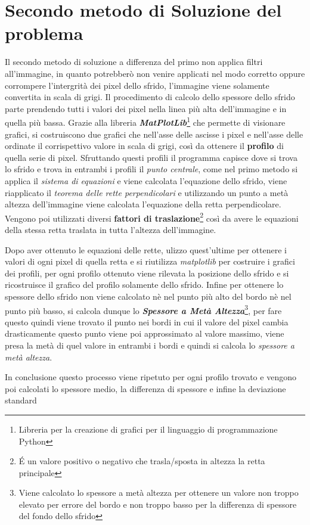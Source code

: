 \documentclass[a4paper, notitlepage, 12pt]{article}
\begin{document}
    \section{Secondo metodo di Soluzione del problema}
    \noindent Il secondo metodo di soluzione a differenza del primo non applica filtri all'immagine, in quanto potrebberò non venire applicati nel modo corretto oppure corrompere l'intergrità
    dei pixel dello sfrido, l'immagine viene solamente convertita in scala di grigi. Il procedimento di calcolo dello spessore dello sfrido parte prendendo tutti i valori dei pixel nella linea più alta 
    dell'immagine e in quella più bassa. Grazie alla libreria \emph{\textbf{MatPlotLib}}\footnote[9]{\indent Libreria per la creazione di grafici per il linguaggio di programmazione Python} che permette di visionare grafici, si costruiscono due grafici che nell'asse delle ascisse i pixel e nell'asse delle ordinate
    il corrispettivo valore in scala di grigi, così da ottenere il \textbf{profilo} di quella serie di pixel. Sfruttando questi profili il programma capisce dove si trova lo sfrido e trova in entrambi i profili
    il \emph{punto centrale}, come nel primo metodo si applica il \emph{sistema di equazioni} e viene calcolata l'equazione dello sfrido, viene riapplicato il \emph{teorema delle rette perpendicolari} e utilizzando un punto a metà altezza dell'immagine
    viene calcolata l'equazione della retta perpendicolare. Vengono poi utilizzati diversi \textbf{fattori di traslazione}\footnote[10]{\indent \'E un valore positivo o negativo che trasla/sposta in altezza la retta principale} così da avere le equazioni della stessa retta traslata in tutta l'altezza
    dell'immagine.\par
    \noindent Dopo aver ottenuto le equazioni delle rette, ulizzo quest'ultime per ottenere i valori di ogni pixel di quella retta e si riutilizza \emph{matplotlib} per costruire i grafici dei profili, 
    per ogni profilo ottenuto viene rilevata la posizione dello sfrido e si ricostruisce il grafico del profilo solamente dello sfrido. Infine per ottenere lo spessore dello sfrido non viene calcolato nè nel punto più alto del bordo
    nè nel punto più basso, si calcola dunque lo \emph{\textbf{Spessore a Metà Altezza}}\footnote[11]{\indent Viene calcolato lo spessore a metà altezza per ottenere un valore non troppo elevato per errore del bordo e non troppo basso per la differenza di spessore del fondo dello sfrido}, per fare questo quindi viene trovato il punto nei bordi in cui il valore del pixel cambia drasticamente
    questo punto viene poi approssimato al valore massimo, viene presa la metà di quel valore in entrambi i bordi e quindi si calcola lo \emph{spessore a metà altezza}.\par
    \noindent In conclusione questo processo viene ripetuto per ogni profilo trovato e vengono poi calcolati lo spessore medio, la differenza di spessore e infine la deviazione standard
\end{document}
